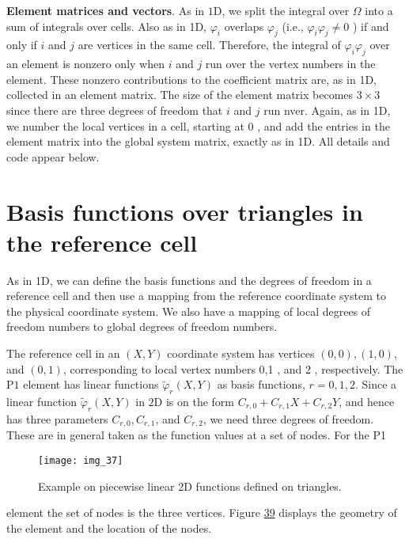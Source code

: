 \documentclass[../main.tex]{subfiles}
\begin{document}
\noindent \textbf{Element matrices and vectors}. As in $1 \mathrm{D}$, we split the integral over $\Omega$ into a sum of integrals over cells. Also as in 1D, $\varphi_{i}$ overlaps $\varphi_{j}$ (i.e., $\varphi_{i} \varphi_{j} \neq 0$ ) if and only if $i$ and $j$ are vertices in the same cell. Therefore, the integral of $\varphi_{i} \varphi_{j}$ over an element is nonzero only when $i$ and $j$ run over the vertex numbers in the element. These nonzero contributions to the coefficient matrix are, as in 1D, collected in an element matrix. The size of the element matrix becomes $3 \times 3$ since there are three degrees of freedom that $i$ and $j$ run nver. Again, as in 1D, we number the local vertices in a cell, starting at 0 , and add the entries in the element matrix into the global system matrix, exactly as in 1D. All details and code appear below.
\bigbreak
\section[Basis functions over triangles in the reference cell]{Basis functions over triangles in the reference cell}
\label{sec:sec_9_2}
\noindent As in 1D, we can define the basis functions and the degrees of freedom in a reference cell and then use a mapping from the reference coordinate system to the physical coordinate system. We also have a mapping of local degrees of freedom numbers to global degrees of freedom numbers.

The reference cell in an $(X, Y)$ coordinate system has vertices $(0,0),(1,0)$, and $(0,1)$, corresponding to local vertex numbers 0,1 , and 2 , respectively. The $\mathrm{P} 1$ element has linear functions $\tilde{\varphi}_{r}(X, Y)$ as basis functions, $r=0,1,2$. Since a linear function $\tilde{\varphi}_{r}(X, Y)$ in $2 \mathrm{D}$ is on the form $C_{r, 0}+C_{r, 1} X+C_{r, 2} Y$, and hence has three parameters $C_{r, 0}, C_{r, 1}$, and $C_{r, 2}$, we need three degrees of freedom. These are in general taken as the function values at a set of nodes. For the P1
\begin{figure}[H]
	\centering
	\texttt{[image: img\_37]}
	\caption{Example on piecewise linear 2D functions defined on triangles.}
	\label{fig:img_37}
\end{figure}
\noindent element the set of nodes is the three vertices. Figure \hyperref[fig:img_39]{39} displays the geometry of the element and the location of the nodes.
\end{document}
